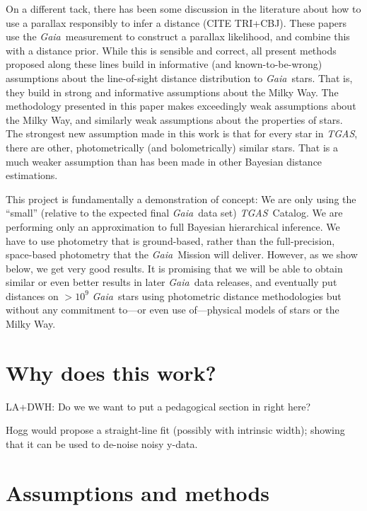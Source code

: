 \documentclass[modern]{aastex61}
\newcommand{\acronym}[1]{{\small{#1}}}
\newcommand{\project}[1]{\textsl{#1}}
\newcommand{\tgas}{\project{\acronym{TGAS}}}
\newcommand{\gaia}{\project{Gaia}}
\begin{document}
On a different tack, there has been some discussion in the literature
about how to use a parallax responsibly to infer a distance (CITE TRI+CBJ).
These papers use the \gaia\ measurement to construct a parallax likelihood,
and combine this with a distance prior.
While this is sensible and correct, all present methods proposed along
these lines build in informative (and known-to-be-wrong) assumptions
about the line-of-sight distance distribution to \gaia\ stars.
That is, they build in strong and informative assumptions about the Milky
Way.
The methodology presented in this paper makes exceedingly weak assumptions
about the Milky Way, and similarly weak assumptions about the properties of
stars.
The strongest new assumption made in this work is that for every star
in \tgas, there are other, photometrically (and bolometrically)
similar stars.
That is a much weaker assumption than has been made in other Bayesian
distance estimations.

This project is fundamentally a demonstration of concept:
We are only using the ``small'' (relative to the expected final \gaia\ data set)
\tgas\ Catalog.
We are performing only an approximation to full Bayesian hierarchical inference.
We have to use photometry that is ground-based, rather than the full-precision,
space-based photometry that the \gaia\ Mission will deliver.
However, as we show below, we get very good results.
It is promising that we will be able to obtain similar or even better results
in later \gaia\ data releases, and eventually put distances on $>10^9$
\gaia\ stars using photometric distance methodologies but without any
commitment to---or even use of---physical models of stars or the Milky Way.

\section{Why does this work?}

LA+DWH: Do we we want to put a pedagogical section in right here?

Hogg would propose a straight-line fit (possibly with intrinsic
width); showing that it can be used to de-noise noisy y-data.

\section{Assumptions and methods}
\end{document}

